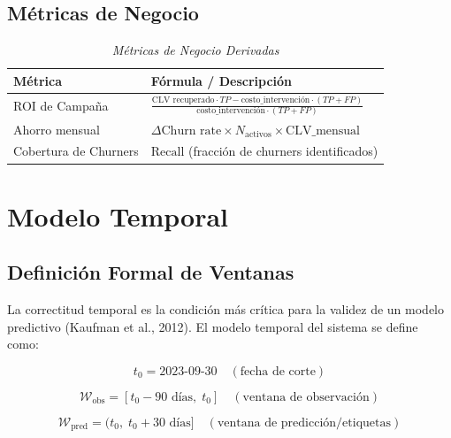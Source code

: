 \documentclass[12pt,a4paper]{article}
\begin{document}
\subsection{Métricas de Negocio}

\begin{table}[htbp]
\centering
\caption{\textit{Métricas de Negocio Derivadas}}
\label{tab:negocio}
\begin{tabular}{@{}p{4cm}p{9.5cm}@{}}
\toprule
\textbf{Métrica} & \textbf{Fórmula / Descripción} \\
\midrule
ROI de Campaña & $\frac{\text{CLV recuperado} \cdot TP - \text{costo\_intervención} \cdot (TP + FP)}{\text{costo\_intervención} \cdot (TP + FP)}$ \\
Ahorro mensual & $\Delta\text{Churn rate} \times N_{\text{activos}} \times \text{CLV\_mensual}$ \\
Cobertura de Churners & $\text{Recall}$ (fracción de churners identificados) \\
\bottomrule
\end{tabular}
\end{table}

\newpage

\section{Modelo Temporal}

\subsection{Definición Formal de Ventanas}

La correctitud temporal es la condición más crítica para la validez de un modelo predictivo (Kaufman et al., 2012). El modelo temporal del sistema se define como:

\begin{equation}
t_0 = \text{2023-09-30} \quad (\text{fecha de corte})
\end{equation}

\begin{equation}
\mathcal{W}_{\text{obs}} = [t_0 - 90\text{ días},\; t_0] \quad (\text{ventana de observación})
\end{equation}

\begin{equation}
\mathcal{W}_{\text{pred}} = (t_0,\; t_0 + 30\text{ días}] \quad (\text{ventana de predicción/etiquetas})
\end{equation}
\end{document}
